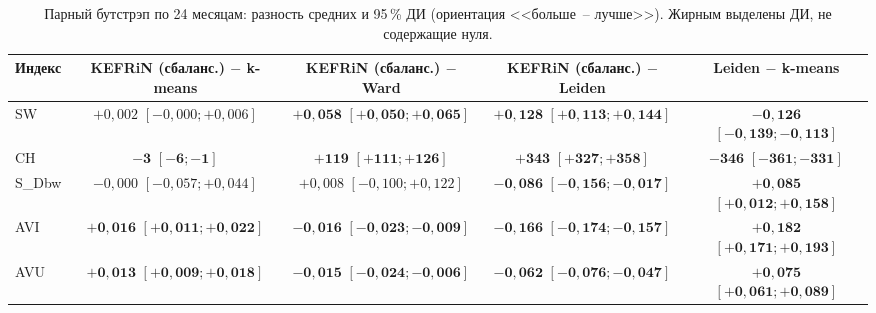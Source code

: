 \documentclass[11pt,a4paper]{article}
\begin{document}
\begin{table}[htbp]
\centering\footnotesize
\caption{Парный бутстрэп по 24 месяцам: разность средних и 95\,\% ДИ (ориентация <<больше~-- лучше>>). Жирным выделены ДИ, не содержащие нуля.}
\label{tab:bootstrap}

\begin{tabular}{lcccc}
\toprule
Индекс & \makecell{KEFRiN (сбаланс.)\\ $-$ k-means} & \makecell{KEFRiN (сбаланс.)\\ $-$ Ward} & \makecell{KEFRiN (сбаланс.)\\ $-$ Leiden} & \makecell{Leiden\\ $-$ k-means} \\
\midrule
SW & \makecell{$+0{,}002$\\ $[-0{,}000; +0{,}006]$} & \makecell{$\mathbf{+0{,}058}$\\ $\mathbf{[+0{,}050; +0{,}065]}$} & \makecell{$\mathbf{+0{,}128}$\\ $\mathbf{[+0{,}113; +0{,}144]}$} & \makecell{$\mathbf{-0{,}126}$\\ $\mathbf{[-0{,}139; -0{,}113]}$} \\
CH & \makecell{$\mathbf{-3}$\\ $\mathbf{[-6; -1]}$} & \makecell{$\mathbf{+119}$\\ $\mathbf{[+111; +126]}$} & \makecell{$\mathbf{+343}$\\ $\mathbf{[+327; +358]}$} & \makecell{$\mathbf{-346}$\\ $\mathbf{[-361; -331]}$} \\
S\_Dbw & \makecell{$-0{,}000$\\ $[-0{,}057; +0{,}044]$} & \makecell{$+0{,}008$\\ $[-0{,}100; +0{,}122]$} & \makecell{$\mathbf{-0{,}086}$\\ $\mathbf{[-0{,}156; -0{,}017]}$} & \makecell{$\mathbf{+0{,}085}$\\ $\mathbf{[+0{,}012; +0{,}158]}$} \\
AVI & \makecell{$\mathbf{+0{,}016}$\\ $\mathbf{[+0{,}011; +0{,}022]}$} & \makecell{$\mathbf{-0{,}016}$\\ $\mathbf{[-0{,}023; -0{,}009]}$} & \makecell{$\mathbf{-0{,}166}$\\ $\mathbf{[-0{,}174; -0{,}157]}$} & \makecell{$\mathbf{+0{,}182}$\\ $\mathbf{[+0{,}171; +0{,}193]}$} \\
AVU & \makecell{$\mathbf{+0{,}013}$\\ $\mathbf{[+0{,}009; +0{,}018]}$} & \makecell{$\mathbf{-0{,}015}$\\ $\mathbf{[-0{,}024; -0{,}006]}$} & \makecell{$\mathbf{-0{,}062}$\\ $\mathbf{[-0{,}076; -0{,}047]}$} & \makecell{$\mathbf{+0{,}075}$\\ $\mathbf{[+0{,}061; +0{,}089]}$} \\

\end{tabular}
\end{table}
\end{document}

